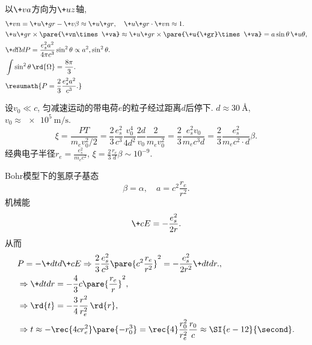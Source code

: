 \documentclass[hidelinks]{ctexart}
\begin{document}
以$\+va$方向为$\+uz$轴,
\begin{align*}
    & \+vn = \+u{\+gr} - \+v\beta \approx \+u{\+gr},\quad \+u{\+gr}\cdot \+vn \approx 1. \\
    & \+u{\+gr} \times \pare{\+vn\times \+va} \approx \+u{\+gr}\times\pare{\+u{\+gr}\times \+va} = a\sin\theta \,\+u\theta, \\
    & \+d\Omega dP = \frac{e_s^2 a^2}{4\pi c^3}\sin^2\theta \propto a^2,\sin^2\theta. \\
    & \int \sin^2\theta\,\rd{\Omega} = \frac{8\pi}{3}. \\
    & \resumath{P = \frac{2}{3}\frac{e_s^2 a^2}{c^3}.}
\end{align*}
\begin{sample}
    \begin{ex}
        设$v_0 \ll c$, 匀减速运动的带电荷$e$的粒子经过距离$d$后停下. $d\approx \SI{30}{\angstrom}$, $v_0 \approx \SI{e5}{\meter\per\second}$.
        \[ \xi = \frac{PT}{m_ev_0^2/2} = \frac{2}{3}\frac{e_s^2}{c^3}\frac{v_0^4}{4d^2}\frac{2d}{v_0}\frac{2}{m_ev_0^2} = \frac{2}{3}\frac{e_s^2 v_0}{m_e c^3 d} = \frac{2}{3}\frac{e_s^2}{m_ec^2\cdot d}\beta. \]
        经典电子半径$\displaystyle r_e = \frac{e_s^2}{m_e c^2}$, $\displaystyle \xi = \frac{2}{3}\frac{r_e}{d}\beta \sim 10^{-9}$.
    \end{ex}
\end{sample}
\begin{sample}
    \begin{ex}
        Bohr模型下的氢原子基态
        \[ \beta = \alpha,\quad a = c^2\frac{r_e}{r^2}. \]
        机械能
        \[ \+cE = -\frac{e_s^2}{2r}. \]
        从而
        \begin{align*}
            & P = -\+dtd{\+cE} \Rightarrow \frac{2}{3}\frac{e_s^2}{c^3}\pare{c^2 \frac{r_e}{r^2}}^2 = -\frac{e_s^2}{2r^2}\+dtdr., \\
            & \Rightarrow \+dtdr = -\frac{4}{3}c\pare{\frac{r_e}{r}}^2,\\
            & \Rightarrow \rd{t} = -\frac{3}{4}\frac{r^2}{r_e^2}\,\rd{r}, \\
            & \Rightarrow t \approx -\rec{4cr_e^2} \pare{-r_0^3} = \rec{4}\frac{r_0^2}{r_e^2}\frac{r_0}{c} \approx \SI{e-12}{\second}.
        \end{align*}
    \end{ex}
\end{sample}


\end{document}
